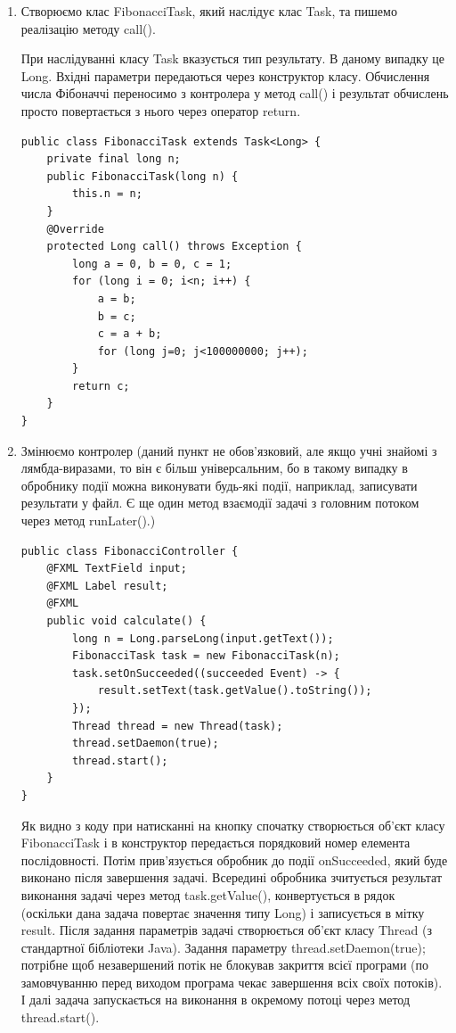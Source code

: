 \begin{enumerate}
	\item Створюємо клас FibonacciTask, який наслідує клас Task, та пишемо реалізацію методу call().

	При наслідуванні класу Task вказується тип результату. В даному випадку це Long. Вхідні параметри передаються через конструктор класу. Обчислення числа Фібоначчі переносимо з контролера у метод call() і результат обчислень просто повертається з нього через оператор return.

\begin{verbatim}
public class FibonacciTask extends Task<Long> {
	private final long n;
	public FibonacciTask(long n) {
		this.n = n;
	}
	@Override
	protected Long call() throws Exception {
		long a = 0, b = 0, c = 1;
		for (long i = 0; i<n; i++) {
			a = b;
			b = c;
			c = a + b;
			for (long j=0; j<100000000; j++);
		}
		return c;
	}
}
\end{verbatim}

	\item Змінюємо контролер (даний пункт не обов'язковий, але якщо учні знайомі з лямбда-виразами, то він є більш універсальним, бо в такому випадку в обробнику події можна виконувати будь-які події, наприклад, записувати результати у файл. Є ще один метод взаємодії задачі з головним потоком через метод runLater().)

\begin{verbatim}
public class FibonacciController {
	@FXML TextField input;
	@FXML Label result;
	@FXML
	public void calculate() {
		long n = Long.parseLong(input.getText());
		FibonacciTask task = new FibonacciTask(n);
		task.setOnSucceeded((succeeded Event) -> {
			result.setText(task.getValue().toString());
		});
        Thread thread = new Thread(task);
        thread.setDaemon(true);
        thread.start();
	}
}
\end{verbatim}

Як видно з коду при натисканні на кнопку спочатку створюється об'єкт класу FibonacciTask і в конструктор передається порядковий номер елемента послідовності. Потім прив'язується обробник до події onSucceeded, який буде виконано після завершення задачі. Всередині обробника зчитується результат виконання задачі через метод task.getValue(), конвертується в рядок (оскільки дана задача повертає значення типу Long) і записується в мітку result.
Після задання параметрів задачі створюється об'єкт класу Thread (з стандартної бібліотеки Java). Задання параметру thread.setDaemon(true); потрібне щоб незавершений потік не блокував закриття всієї програми (по замовчуванню перед виходом програма чекає завершення всіх своїх потоків). І далі задача запускається на виконання в окремому потоці через метод thread.start().


\end{enumerate}
